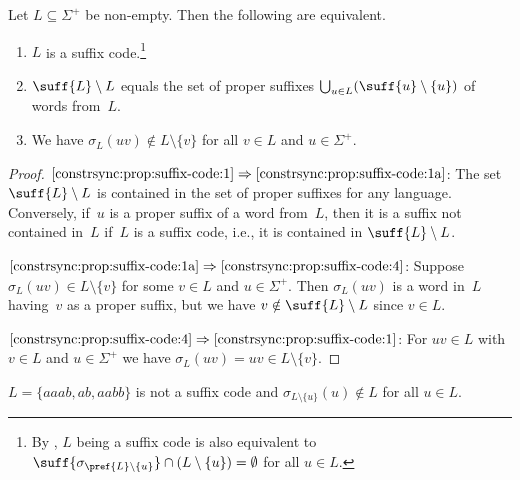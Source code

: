 \begin{proposition} \label{constrsync:prop:suffix-code}
	Let $L \subseteq \Sigma^+$ be non-empty. Then the following are equivalent.
	\begin{enumerate}
		\item \label{constrsync:prop:suffix-code:1} $L$ is a suffix code.\footnote{By , $L$ being a suffix code
		is also equivalent to $\suff{\sigma_{\pref{L}\setminus\{u\}}} \cap ( L \setminus \{u\} ) = \emptyset$
		for all $u \in L$.}
		
		\item \label{constrsync:prop:suffix-code:1a} $\suff{L} \setminus L$ equals the set of proper suffixes
		$\bigcup_{u \in L} ( \suff{u}\setminus\{u\} )$ of words from~$L$.
				
		\item \label{constrsync:prop:suffix-code:4} 
		We have $\sigma_L(uv) \notin L \setminus\{v\}$ for all $v \in L$ and $u \in \Sigma^+$.
	\end{enumerate}
\end{proposition}
\begin{proof}
	$\ref{constrsync:prop:suffix-code:1} \Rightarrow \ref{constrsync:prop:suffix-code:1a}$: The set $\suff{L}\setminus L$
	is contained in the set of proper suffixes for any language. Conversely, if~$u$ is a proper suffix of a word from~$L$,
	then it is a suffix not contained in~$L$ if~$L$ is a suffix code, i.e., it is contained in $\suff{L}\setminus L$.
			
	$\ref{constrsync:prop:suffix-code:1a} \Rightarrow \ref{constrsync:prop:suffix-code:4}$: 
	Suppose $\sigma_L(uv) \in L \setminus \{v\}$ for some $v \in L$
	and $u \in \Sigma^+$. Then $\sigma_L(uv)$ is a word in~$L$
	having~$v$ as a proper suffix, but we have $v \notin \suff{L} \setminus L$ since $v \in L$.
		
	$\ref{constrsync:prop:suffix-code:4} \Rightarrow \ref{constrsync:prop:suffix-code:1}$: For $uv \in L$ with $v \in L$ and $u \in \Sigma^+$ we have $\sigma_L(uv) = uv \in L \setminus \{ v \}$.
\end{proof}

\begin{example}
	 $L = \{aaab,ab,aabb\}$ is not a suffix code and $\sigma_{L\setminus\{u\}}(u) \notin L$ for all $u \in L$.
\end{example}

